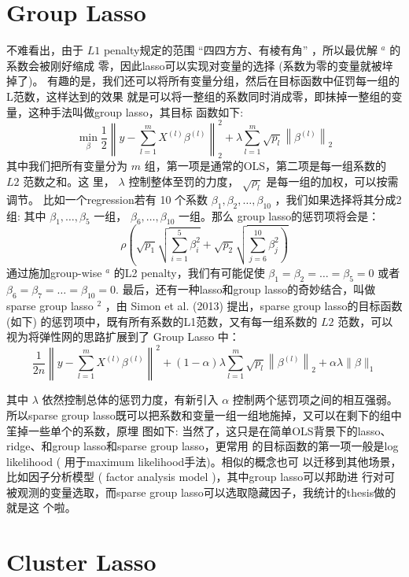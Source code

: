 {\section{Group Lasso}
不难看出，由于 $L 1$ penalty规定的范围 “四四方方、有棱有角” ，所以最优解 $^{a}$ 的系数会被刚好缩成 零，因此lasso可以实现对变量的选择 (系数为零的变量就被垶掉了)。
有趣的是，我们还可以将所有变量分组，然后在目标函数中佂罚每一组的L范数，这样达到的效果 就是可以将一整组的系数同时消成零，即抺掉一整组的变量，这种手法叫做group lasso，其目标 函数如下:
$$
\min _{\beta} \frac{1}{2}\left\|y-\sum_{l=1}^{m} X^{(l)} \beta^{(l)}\right\|_{2}^{2}+\lambda \sum_{l=1}^{m} \sqrt{p_{l}}\left\|\beta^{(l)}\right\|_{2}
$$
其中我们把所有变量分为 $m$ 组，第一项是通常的OLS，第二项是每一组系数的 $L 2$ 范数之和。这 里， $\lambda$ 控制整体至罚的力度， $\sqrt{\rho_{l}}$ 是每一组的加权，可以按需调节。
比如一个regression若有 10 个系数 $\beta_{1}, \beta_{2}, \ldots, \beta_{10}$ ，我们如果选择将其分成2组: 其中 $\beta_{1}, \ldots, \beta_{5}$ 一组， $\beta_{6}, \ldots, \beta_{10}$ 一组。那么 group lasso的惩罚项将会是：
$$
\rho\left(\sqrt{p_{1}} \sqrt{\sum_{i=1}^{5} \beta_{i}^{2}}+\sqrt{p_{2}} \sqrt{\left.\sum_{j=6}^{10} \beta_{j}^{2}\right)}\right.
$$
通过施加group-wise ${ }^{a}$ 的L2 penalty，我们有可能促使 $\beta_{1}=\beta_{2}=\ldots=\beta_{5}=0$ 或者 $\beta_{6}=\beta_{7}=\ldots=\beta_{10}=0$.
最后，还有一种lasso和group lasso的奇妙结合，叫做 sparse group lasso $^{2}$ ，由 Simon et al. (2013) 提出，sparse group lasso的目标函数 (如下) 的惩罚项中，既有所有系数的L1范数，又有每一组系数的 $L2$ 范数，可以视为将弹性网的思路扩展到了 Group Lasso 中：
$$
\frac{1}{2 n}\left\|y-\sum_{l=1}^{m} X^{(l)} \beta^{(l)}\right\|^{2}+(1-\alpha) \lambda \sum_{l=1}^{m} \sqrt{p_{l}}\left\|\beta^{(l)}\right\|_{2}+\alpha \lambda\|\beta\|_{1}
$$

其中 $\lambda$ 依然控制总体的惩罚力度，有新引入 $\alpha$ 控制两个惩罚项之间的相互强弱。所以sparse group lasso既可以把系数和变量一组一组地施掉，又可以在剩下的组中䇠掉一些单个的系数，原埋 图如下:
当然了，这只是在简单OLS背景下的lasso、ridge、和group lasso和sparse group lasso，更常用 的目标函数的第一项一般是log likelihood ( 用于maximum likelihood手法)。相似的概念也可 以迁移到其他场景，比如因子分析模型 ( factor analysis model )，其中group lasso可以邦助进 行对可被观测的变量选取，而sparse group lasso可以选取隐藏因子，我统计的thesis做的就是这 个啦。

\section{Cluster Lasso}

}
